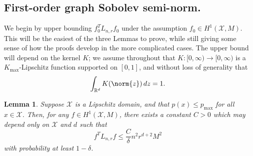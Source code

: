 \documentclass{article}
\newcommand{\Reals}{\mathbb{R}}
\newcommand{\1}{\mathbf{1}}
\newcommand{\Lap}{L}
\newcommand{\Xset}{\mathcal{X}}
\theoremstyle{alden}
\theoremstyle{aldenthm}
\newtheorem{lemma}{Lemma}
\theoremstyle{definition}
\theoremstyle{remark}
\begin{document}
\subsection{First-order graph Sobolev semi-norm.}
We begin by upper bounding $f_0^T \Lap_{n,r} f_0$ under the assumption $f_0 \in H^1(\Xset,M)$. This will be the easiest of the three Lemmas to prove, while still giving some sense of how the proofs develop in the more complicated cases. The upper bound will depend on the kernel $K$; we assume throughout that $K:[0,\infty) \to [0,\infty)$ is a $K_{\max}$-Lipschitz function supported on $[0,1]$, and without loss of generality that
\begin{equation*}
\int_{\Reals^d} K(\norm{z}) \,dz = 1.
\end{equation*}
\begin{lemma}
	\label{lem:first_order_graph_sobolev_seminorm}
	Suppose $\Xset$ is a Lipschitz domain, and that $p(x) \leq p_{\max}$ for all $x \in \Xset$. Then, for any $f \in H^1(\Xset,M)$, there exists a constant $C > 0$ which may depend only on $\Xset$ and $d$ such that
	\begin{equation}
	f^T \Lap_{n,r} f \leq \frac{C}{\delta} n^2 r^{d + 2} M^2
	\end{equation}
	with probability at least $1 - \delta$.
\end{lemma}
\end{document}
